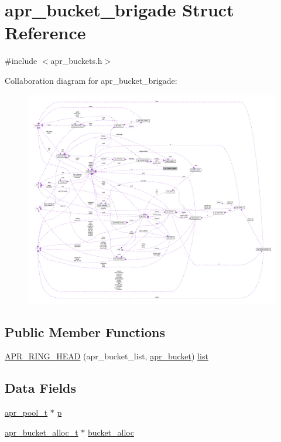 \hypertarget{structapr__bucket__brigade}{}\section{apr\+\_\+bucket\+\_\+brigade Struct Reference}
\label{structapr__bucket__brigade}


{\ttfamily \#include $<$apr\+\_\+buckets.\+h$>$}



Collaboration diagram for apr\+\_\+bucket\+\_\+brigade\+:
\nopagebreak
\begin{figure}[H]
\begin{center}
\leavevmode
\includegraphics[width=350pt]{structapr__bucket__brigade__coll__graph}
\end{center}
\end{figure}
\subsection*{Public Member Functions}
\begin{DoxyCompactItemize}
\item 
\hyperlink{structapr__bucket__brigade_a76a313afc83dd161916f3f9b83eea734}{A\+P\+R\+\_\+\+R\+I\+N\+G\+\_\+\+H\+E\+AD} (apr\+\_\+bucket\+\_\+list, \hyperlink{structapr__bucket}{apr\+\_\+bucket}) \hyperlink{pcregrep_8txt_aeb6b944e4524f915483b5696b7f2f424}{list}
\end{DoxyCompactItemize}
\subsection*{Data Fields}
\begin{DoxyCompactItemize}
\item 
\hyperlink{structapr__pool__t}{apr\+\_\+pool\+\_\+t} $\ast$ \hyperlink{structapr__bucket__brigade_a8e03b4dd531903709ae3ae8ebe9e46ee}{p}
\item 
\hyperlink{structapr__bucket__alloc__t}{apr\+\_\+bucket\+\_\+alloc\+\_\+t} $\ast$ \hyperlink{structapr__bucket__brigade_a9f58f90a088f02ebb6f935f004092aaa}{bucket\+\_\+alloc}
\end{DoxyCompactItemize}


